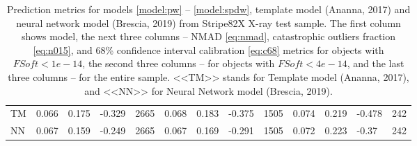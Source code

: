 \documentclass[fleqn,usenatbib]{mnras}
\begin{document}
\begin{table}
\begin{tabular}{llllrlllrlllr}
            TM &                             0.066 &           0.175 &           -0.329 &        2665 &                             0.068 &           0.183 &           -0.375 &        1505 &                            0.074 &           0.219 &          -0.478 &         242 \\
            NN              &                             0.067 &           0.159 &           -0.249 &        2665 &                             0.067 &           0.169 &           -0.291 &        1505 &                            0.072 &           0.223 &           -0.37 &         242 \\
            \hline
            \end{tabular}
            \caption{Prediction metrics for models \ref{model:pw} -- \ref{model:spdw}, template model (Ananna, 2017) and neural network model (Brescia, 2019) from Stripe82X X-ray test sample. The first column shows model, the next three columns -- NMAD \eqref{eq:nmad}, catastrophic outliers fraction \eqref{eq:n015}, and 68\% confidence interval calibration \eqref{eq:c68} metrics for objects with $FSoft < 1e-14$, the second three columns -- for objects with $FSoft < 4e-14$, and the last three columns -- for the entire sample. <<TM>> stands for Template model (Ananna, 2017), and <<NN>> for Neural Network model (Brescia, 2019).}
\end{table}




\end{document}
